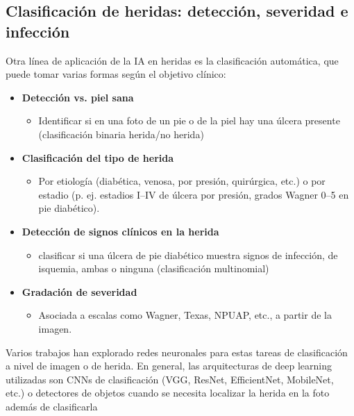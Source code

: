 \subsection{Clasificación de heridas: detección, severidad e infección}

Otra línea de aplicación de la IA en heridas es la clasificación automática, que puede tomar varias formas según el objetivo clínico:
\begin{itemize}
    \item \textbf{Detección vs. piel sana}
    \begin{itemize}
        \item Identificar si en una foto de un pie o de la piel hay una úlcera presente (clasificación binaria herida/no herida)
    \end{itemize}
    \item \textbf{Clasificación del tipo de herida}
    \begin{itemize}
        \item  Por etiología (diabética, venosa, por presión, quirúrgica, etc.) o por estadio (p. ej. estadios I–IV de úlcera por presión, grados Wagner 0–5 en pie diabético).
    \end{itemize}
    \item \textbf{Detección de signos clínicos en la herida}
    \begin{itemize}
        \item clasificar si una úlcera de pie diabético muestra signos de infección, de isquemia, ambas o ninguna (clasificación multinomial)
    \end{itemize}
    \item \textbf{Gradación de severidad}
    \begin{itemize}
        \item Asociada a escalas como Wagner, Texas, NPUAP, etc., a partir de la imagen.
    \end{itemize}
\end{itemize}

Varios trabajos han explorado redes neuronales para estas tareas de clasificación a nivel de imagen o de herida. En general, las arquitecturas de deep learning utilizadas son CNNs de clasificación (VGG, ResNet, EfficientNet, MobileNet, etc.) o detectores de objetos cuando se necesita localizar la herida en la foto además de clasificarla

